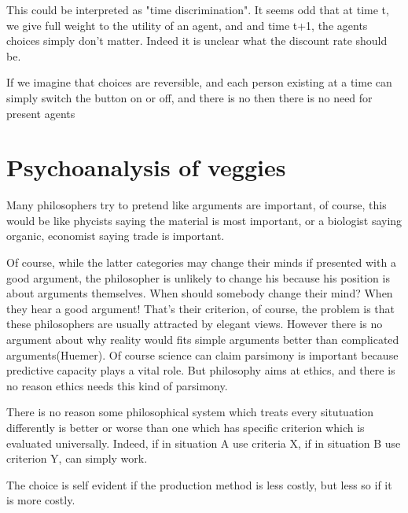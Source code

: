 \documentclass[12pt]{report}
\numberwithin{equation}{section}
\begin{document}
This could be interpreted as "time discrimination". It seems odd that at time t, we give full weight to the utility of an agent, and and time t+1, the agents choices simply don't matter. Indeed it is unclear what the discount rate should be. 

If we imagine that choices are reversible, and each person existing at a time can simply switch the button on or off, and there is no then there is no need for present agents 


\section{Psychoanalysis of veggies}

Many philosophers try to pretend like arguments are important, of course, this would be like phycists saying the material is most important, or a biologist saying organic, economist saying trade is important. 

Of course, while the latter categories may change their minds if presented with a good argument, the philosopher is unlikely to change his because his position is about arguments themselves. When should somebody change their mind? When they hear a good argument! That's their criterion, of course, the problem is that these philosophers are usually attracted by elegant views. However there is no argument about why reality would fits simple arguments better than complicated arguments(Huemer). Of course science can claim parsimony is important because predictive capacity plays a vital role. But philosophy aims at ethics, and there is no reason ethics needs this kind of parsimony. 

There is no reason some philosophical system which treats every situtuation differently is better or worse than one which has specific criterion which is evaluated universally. Indeed, if in situation A use criteria X, if in situation B use criterion Y, can simply work. 


The choice is self evident if the production method is less costly, but less so if it is more costly. 
\end{document}
